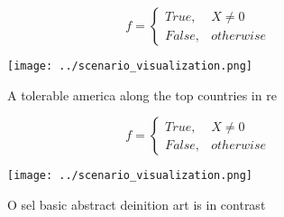 \documentclass[a4paper]{article}
\begin{document}
\begin{equation}   f =
\begin{cases} True, & X \neq 0\\
False, & otherwise
\end{cases}
\end{equation}

\begin{figure}
\centering
\texttt{[image: ../scenario\_visualization.png]}
\caption{A tolerable america along the top countries in re
}
\end{figure}
 
\begin{equation}   f =
\begin{cases} True, & X \neq 0\\
False, & otherwise
\end{cases}
\end{equation}

\begin{figure}
\centering
\texttt{[image: ../scenario\_visualization.png]}
\caption{O sel basic abstract deinition art is in contrast
}
\end{figure}
 
\end{document}
